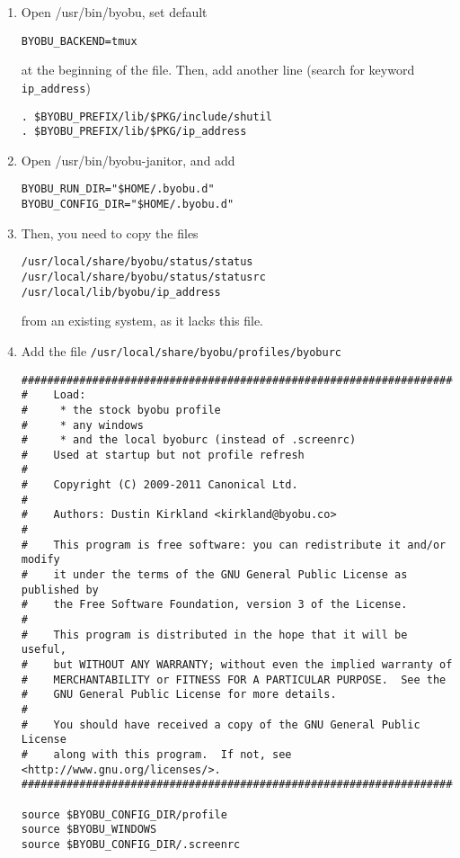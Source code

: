 \begin{enumerate}
  \item Open /usr/bin/byobu, set default
\begin{verbatim}
BYOBU_BACKEND=tmux 
\end{verbatim}
at the beginning of the file. Then, add another line (search for keyword 
\verb!ip_address!)
\begin{verbatim}
. $BYOBU_PREFIX/lib/$PKG/include/shutil                                                                                                                                                                                       
. $BYOBU_PREFIX/lib/$PKG/ip_address
\end{verbatim}
  
  \item Open /usr/bin/byobu-janitor, and add
\begin{verbatim}
BYOBU_RUN_DIR="$HOME/.byobu.d"
BYOBU_CONFIG_DIR="$HOME/.byobu.d"
\end{verbatim}

  \item Then, you need to copy the files 
\begin{verbatim}
/usr/local/share/byobu/status/status
/usr/local/share/byobu/status/statusrc
/usr/local/lib/byobu/ip_address
\end{verbatim}
from an existing system, as it lacks this file.

  \item Add the file \verb!/usr/local/share/byobu/profiles/byoburc!
  
\begin{verbatim}
###############################################################################                                                                                                                                               
#    Load:
#     * the stock byobu profile
#     * any windows
#     * and the local byoburc (instead of .screenrc)
#    Used at startup but not profile refresh
#
#    Copyright (C) 2009-2011 Canonical Ltd.
#
#    Authors: Dustin Kirkland <kirkland@byobu.co>
#
#    This program is free software: you can redistribute it and/or modify
#    it under the terms of the GNU General Public License as published by
#    the Free Software Foundation, version 3 of the License.
#
#    This program is distributed in the hope that it will be useful,
#    but WITHOUT ANY WARRANTY; without even the implied warranty of
#    MERCHANTABILITY or FITNESS FOR A PARTICULAR PURPOSE.  See the
#    GNU General Public License for more details.
#
#    You should have received a copy of the GNU General Public License
#    along with this program.  If not, see <http://www.gnu.org/licenses/>.
###############################################################################

source $BYOBU_CONFIG_DIR/profile
source $BYOBU_WINDOWS
source $BYOBU_CONFIG_DIR/.screenrc
\end{verbatim}
\end{enumerate}



